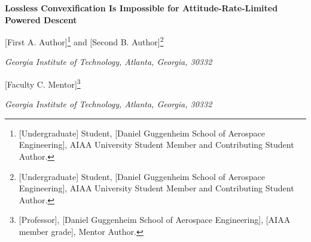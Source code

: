 
\newtheorem{definition}{Definition}
\newcommand{\R}{\mathbb{R}}
\newcommand{\F}{F_{t_f}}
\newcommand{\FX}{F^{X}_{t_f}}
\newcommand{\us}{\_\allowbreak}
\newcommand{\lean}[1]{\texttt{\small #1}}


\begin{center}
{\fontsize{24}{28}\selectfont\bfseries Lossless Convexification Is Impossible for Attitude-Rate-Limited Powered Descent\par}
\vspace{14pt}
{\large [First A. Author]\footnote{[Undergraduate] Student, [Daniel Guggenheim School of Aerospace Engineering], AIAA University Student
Member and Contributing Student Author.} and [Second B. Author]\footnote{[Undergraduate] Student, [Daniel Guggenheim School of
Aerospace Engineering], AIAA University Student Member and Contributing Student Author.}\par}
{\large\itshape Georgia Institute of Technology, Atlanta, Georgia, 30332\par}
\vspace{10pt}
{\large [Faculty C. Mentor]\footnote{[Professor], [Daniel Guggenheim School of Aerospace Engineering], [AIAA member grade], Mentor Author.}\par}
{\large\itshape Georgia Institute of Technology, Atlanta, Georgia, 30332\par}
\end{center}

